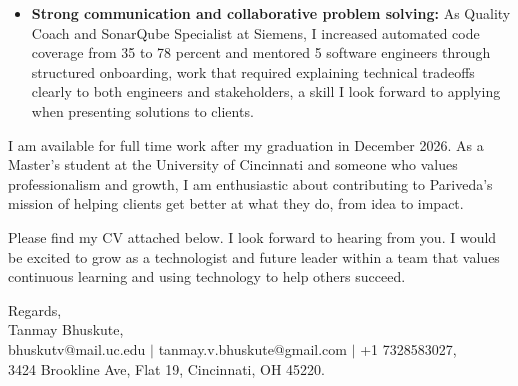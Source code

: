 \documentclass[11pt]{letter}
\begin{document}
\begin{letter}{}
\begin{itemize}[leftmargin=*, itemsep=0.45em]
    \item \textbf{Strong communication and collaborative problem solving:} As Quality Coach and SonarQube Specialist at Siemens, I increased automated code coverage from 35 to 78 percent and mentored 5 software engineers through structured onboarding, work that required explaining technical tradeoffs clearly to both engineers and stakeholders, a skill I look forward to applying when presenting solutions to clients.
\end{itemize}

I am available for full time work after my graduation in December 2026. As a Master's student at the University of Cincinnati and someone who values professionalism and growth, I am enthusiastic about contributing to Pariveda's mission of helping clients get better at what they do, from idea to impact.

Please find my CV attached below. I look forward to hearing from you. I would be excited to grow as a technologist and future leader within a team that values continuous learning and using technology to help others succeed.

{\setlength{\parskip}{0pt}
Regards,\\
Tanmay Bhuskute,\\
bhuskutv@mail.uc.edu $\mid$ tanmay.v.bhuskute@gmail.com $\mid$ +1 7328583027,\\
3424 Brookline Ave, Flat 19, Cincinnati, OH 45220.
}

\end{letter}
\end{document}

